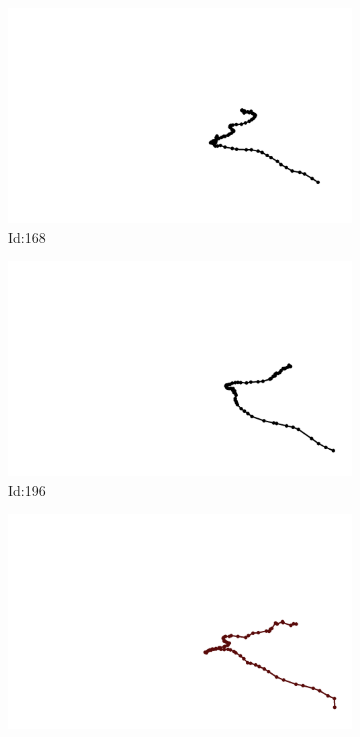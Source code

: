 \documentclass[12pt,twoside]{report}
\begin{document}
\begin{figure}
\centering
\begin{subfigure}[b]{0.20\textwidth}
\centering
\includegraphics[width=\textwidth]{../../trajectories/168.png}
\caption{Id:168}
\end{subfigure}
\begin{subfigure}[b]{0.20\textwidth}
\centering
\includegraphics[width=\textwidth]{../../trajectories/196.png}
\caption{Id:196}
\end{subfigure}
\begin{subfigure}[b]{0.20\textwidth}
\centering
\includegraphics[width=\textwidth]{../../trajectories/453.png}

\end{subfigure}
\end{figure}
\end{document}
